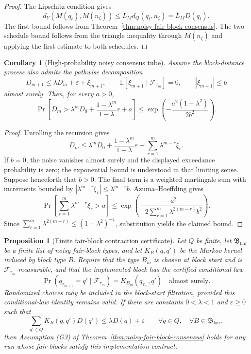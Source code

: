 \documentclass[11pt]{article}
\newtheorem{corollary}[theorem]{Corollary}
\newtheorem{proposition}[theorem]{Proposition}
\theoremstyle{remark}
\theoremstyle{plain}
\begin{document}
\begin{proof}
The Lipschitz condition gives
\[
d_Y(M(q_t),M(n_\zeta))
\le
L_M d_Q(q_t,n_\zeta)
=
L_M D(q_t).
\]
The first bound follows from Theorem~\ref{thm:noisy-fair-block-consensus}. The two-schedule bound
follows from the triangle inequality through \(M(n_\zeta)\) and applying the first estimate to
both schedules.
\end{proof}

\begin{corollary}[High-probability noisy consensus tube]
\label{cor:high-prob-noisy-tube}
Assume the block-distance process also admits the pathwise decomposition
\[
D_{m+1}
\le
\lambda D_m+\varepsilon+\xi_{m+1},
\qquad
\mathbb E[\xi_{m+1}\mid\mathcal F_{\tau_m}]=0,
\qquad
|\xi_{m+1}|\le b
\]
almost surely. Then, for every \(a>0\),
\[
\Pr\!\left[
D_m>
\lambda^mD_0
+
\frac{1-\lambda^m}{1-\lambda}\varepsilon
+
a
\right]
\le
\exp\!\left(
-\frac{a^2(1-\lambda^2)}{2b^2}
\right).
\]
\end{corollary}

\begin{proof}
Unrolling the recursion gives
\[
D_m
\le
\lambda^mD_0
+
\frac{1-\lambda^m}{1-\lambda}\varepsilon
+
\sum_{r=1}^{m}\lambda^{m-r}\xi_r.
\]
If \(b=0\), the noise vanishes almost surely and the displayed exceedance
probability is zero; the exponential bound is understood in that limiting
sense. Suppose henceforth that \(b>0\). The final term is a weighted martingale sum with increments bounded by
\(|\lambda^{m-r}\xi_r|\le\lambda^{m-r}b\). Azuma--Hoeffding gives
\[
\Pr\!\left[
\sum_{r=1}^{m}\lambda^{m-r}\xi_r>a
\right]
\le
\exp\!\left(
-\frac{a^2}{2\sum_{r=1}^{m}\lambda^{2(m-r)}b^2}
\right).
\]
Since \(\sum_{r=1}^{m}\lambda^{2(m-r)}\le(1-\lambda^2)^{-1}\), substitution yields the claimed
bound.
\end{proof}

\begin{proposition}[Finite fair-block contraction certificate]
\label{prop:finite-fair-block-certificate}
Let \(Q\) be finite, let \(\mathfrak B_{\mathrm{fair}}\) be a finite list of noisy fair-block
types, and let \(K_B(q,q')\) be the Markov kernel induced by block type \(B\).
Require that the type \(B_m\) is chosen at block start and is
\(\mathcal F_{\tau_m}\)-measurable, and that the implemented block has the
certified conditional law
\[
 \Pr(q_{\tau_{m+1}}=q'\mid\mathcal F_{\tau_m})
 =K_{B_m}(q_{\tau_m},q')
 \quad\text{almost surely}.
\]
Randomized choices may be included in the block-start filtration, provided
this conditional-law identity remains valid. If there are
constants \(0<\lambda<1\) and \(\varepsilon\ge0\) such that
\[
\sum_{q'\in Q}K_B(q,q')D(q')
\le
\lambda D(q)+\varepsilon
\qquad
\forall q\in Q,\quad \forall B\in\mathfrak B_{\mathrm{fair}},
\]
then Assumption (G3) of Theorem~\ref{thm:noisy-fair-block-consensus} holds for any run whose
fair blocks satisfy this implementation contract.
\end{proposition}
\end{document}

